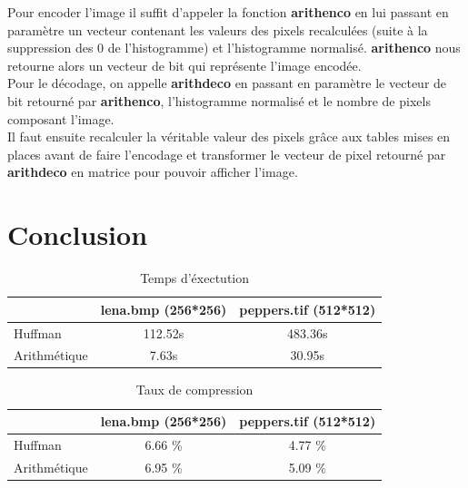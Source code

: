 \documentclass[a4paper, 12pt]{article}
\begin{document}
Pour encoder l'image il suffit d'appeler la fonction \textbf{arithenco} en lui passant en paramètre un vecteur contenant les valeurs des pixels recalculées (suite à la suppression des 0 de l'histogramme) et l'histogramme normalisé. \textbf{arithenco} nous retourne alors un vecteur de bit qui représente l'image encodée.\\

Pour le décodage, on appelle \textbf{arithdeco} en passant en paramètre le vecteur de bit retourné par \textbf{arithenco}, l'histogramme normalisé et le nombre de pixels composant l'image. \\

Il faut ensuite recalculer la véritable valeur des pixels grâce aux tables mises en places avant de faire l'encodage et transformer le vecteur de pixel retourné par \textbf{arithdeco} en matrice pour pouvoir afficher l'image.

\section{Conclusion}

\begin{table}[!h]
	\centering
		\begin{tabular}{l|c | c|}
			\cline{2-3}
			                                   & lena.bmp (256*256) & peppers.tif (512*512) \\
			\hline
			\multicolumn{1}{|l|}{Huffman}      & 112.52s            & 483.36s               \\
			\hline
			\multicolumn{1}{|l|}{Arithmétique} & 7.63s              & 30.95s                \\
			\hline
		\end{tabular}
	\caption{Temps d'éxectution}
	\label{tab:TableTempsExec}
\end{table}

\begin{table}[!h]
	\centering
		\begin{tabular}{l|c | c|}
			\cline{2-3}
			                                   & lena.bmp (256*256) & peppers.tif (512*512) \\
			\hline
			\multicolumn{1}{|l|}{Huffman}      & 6.66 \%            & 4.77 \%               \\
			\hline
			\multicolumn{1}{|l|}{Arithmétique} & 6.95 \%            & 5.09 \%               \\
			\hline
		\end{tabular}
	\caption{Taux de compression}
	\label{tab:TableTauxCompress}
\end{table}
\end{document}
